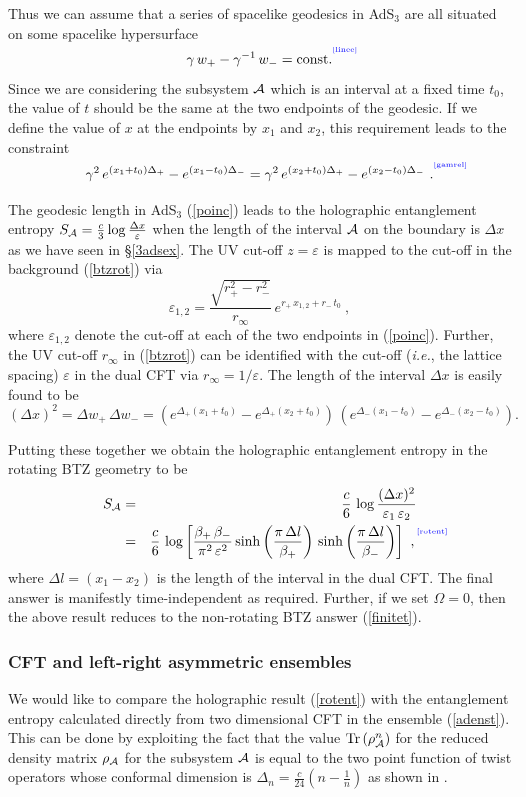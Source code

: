 \documentclass[12pt]{article}
\newcommand{\be}{\begin{equation}}
\newcommand{\ee}{\end{equation}}
\def\sec#1{\S \;\ref{#1}}
\def\req#1{(\ref{#1})}
\def\({\left (}
\def\){\right )}
\def\ie{{\it i.e.}}
\def\veps{\varepsilon}
\def\D{\Delta}
\def\s{\sigma}
\def\CA{{\cal A}}
\def\f#1#2{{\frac{#1}{#2}}}
\def\f#1#2{{\frac{#1}{#2}}}
\def\Tr#1{{\rm Tr}\(#1\)}
\def\Label#1{\label{#1}%
{ \color{blue}{\smash{\hbox to0pt{\raise2ex\hbox{\tiny[#1]}\hss}}}}}
\def\rA{\CA}
\def\cof{{\veps}}
\def\Dr{\D}
\def\s{\sqrt}
\def\f {\frac}
\def\no{\nonumber \\}
\def\ba{\begin{eqnarray}}
\def\ea{\end{eqnarray}}
\begin{document}
Thus we can assume that a series of spacelike geodesics in  AdS$_3$
are all situated on some spacelike hypersurface
%
\be
\gamma \, w_{+}-\gamma^{-1}\,  w_{-}=\mbox{const.}
\Label{linee}\ee
%
 Since we are
considering the subsystem $\rA$ which is an interval at a fixed time
$t_0$, the value of $t$ should be the same at the two endpoints of the geodesic. If we define the value of $x$ at the endpoints by $x_1$ and $x_2$, this requirement leads to the constraint
%
\be \gamma^2 \,
e^{\(x_1+t_0\) \Dr_+  }-e^{\(x_1-t_0\) \Dr_- }
=\gamma^2\,
e^{\(x_2+t_0\) \Dr_+ }-e^{\(x_2-t_0\)\Dr_- } \ .
\Label{gamrel} \ee
%

The geodesic length in  AdS$_3$ (\ref{poinc}) leads to the
holographic entanglement entropy $S_{\cal A}=\f{c}{3}\log \f{\Delta
x }{\cof}$ when the length of the interval $\rA$ on the boundary is $\Delta x$
as we have seen in \sec{3adsex}.
The UV cut-off $z=\cof$ is mapped to the cut-off in the
background \req{btzrot} via
%
\be
\cof_{1,2}=
\f{\s{r_{+}^2-r_{-}^2}}{r_{\infty}}\, e^{r_{+}\, x_{1,2}+
r_{-}\,  t_0}\ , \ee
%
 where $\cof_{1,2}$ denote the cut-off at each of
the two endpoints in \req{poinc}. Further, the UV cut-off $r_{\infty}$ in
\req{btzrot} can be identified with the cut-off (\ie, the lattice
spacing) $\cof$ in the dual CFT via $  r_{\infty}=1/\cof$.
The length of the interval $\D x$  is easily found to be
%
\be (\Delta
x)^2=\Delta w_{+}\, \Delta
w_{-}=\left(e^{\Dr_+(x_1+t_0)}-e^{\Dr_+ (x_2+t_0)}\right)\,
\left(e^{\Dr_- (x_1-t_0)}-e^{\Dr_- (x_2-t_0)}\right).
\ee
%

Putting these together we obtain the holographic entanglement
entropy in the rotating BTZ geometry to be
%
\ba S_{{\cal A}}&=&\f{c}{6}\, \log\f{(\Delta
x)^2}{\cof_1\, \cof_2} \no
&=&
\f{c}{6}\, \log \left[\f{\beta_+\,\beta_-}{\pi^2\, \cof^2}\sinh\left(\f{\pi
\, \Delta l}{\beta_+}\right)\, \sinh\left(\f{\pi \, \Delta
l}{\beta_-}\right) \right]\ ,
\Label{rotent} \ea
%
where $\Delta l=(x_1-x_2)$ is the length of the interval in the dual CFT. The final answer is manifestly time-independent as required. Further, if we set
$\Omega=0$, then the above result reduces to the non-rotating BTZ answer \req{finitet}.

\subsubsection{CFT and  left-right asymmetric ensembles}

We would like to compare the holographic result \req{rotent} with
the entanglement entropy calculated directly from two dimensional
CFT in the ensemble \req{adenst}. This can be done by exploiting the
fact that the value $\Tr{\rho_\rA^n}$ for the reduced density matrix
$\rho_\rA$ for the subsystem $\rA$ is equal to the two point
function of twist operators whose conformal dimension is
$\Delta_{n}=\f{c}{24}(n-\f{1}{n})$ as shown in
\cite{Calabrese:2004eu}.
\end{document}
